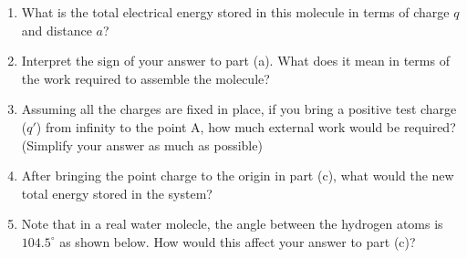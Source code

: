 \begin{enumerate}
    \item What is the total electrical energy stored in this molecule in terms of charge $q$ and distance $a$?
    \item Interpret the sign of your answer to part (a). What does it mean in terms of the work required to assemble the molecule?
    \item Assuming all the charges are fixed in place, if you bring a positive test charge ($q'$) from infinity to the point A, how much external work would be required?\\
    (Simplify your answer as much as possible)
    \item After bringing the point charge to the origin in part (c), what would the new total energy stored in the system?
    \item Note that in a real water molecle, the angle between the hydrogen atoms is $104.5^\circ$ as shown below. How would this affect your answer to part (c)?
    \begin{center}
    \end{center}
\end{enumerate}

